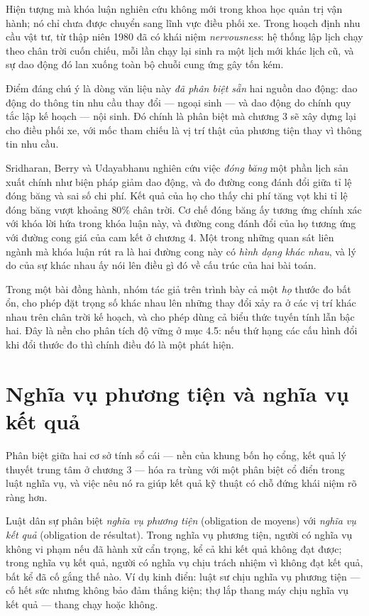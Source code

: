 Hiện tượng mà khóa luận nghiên cứu không mới trong khoa học quản trị vận hành; nó chỉ chưa
được chuyển sang lĩnh vực điều phối xe. Trong hoạch định nhu cầu vật tư, từ thập niên 1980 đã
có khái niệm \emph{nervousness}: hệ thống lập lịch chạy theo chân trời cuốn chiếu, mỗi lần chạy
lại sinh ra một lịch mới khác lịch cũ, và sự dao động đó lan xuống toàn bộ chuỗi cung ứng gây
tốn kém.

Điểm đáng chú ý là dòng văn liệu này \emph{đã phân biệt sẵn} hai nguồn dao động: dao động do
thông tin nhu cầu thay đổi --- ngoại sinh --- và dao động do chính quy tắc lập kế hoạch ---
nội sinh. Đó chính là phân biệt mà chương 3 sẽ xây dựng lại cho điều phối xe, với mốc tham
chiếu là vị trí thật của phương tiện thay vì thông tin nhu cầu.

Sridharan, Berry và Udayabhanu \cite{sridharan1987} nghiên cứu việc \emph{đóng băng} một phần
lịch sản xuất chính như biện pháp giảm dao động, và đo đường cong đánh đổi giữa tỉ lệ đóng băng
và sai số chi phí. Kết quả của họ cho thấy chi phí tăng vọt khi tỉ lệ đóng băng vượt khoảng
$80\%$ chân trời. Cơ chế đóng băng ấy tương ứng chính xác với khóa lời hứa trong khóa luận này,
và đường cong đánh đổi của họ tương ứng với đường cong giá của cam kết ở chương 4. Một trong
những quan sát liên ngành mà khóa luận rút ra là hai đường cong này có \emph{hình dạng khác
nhau}, và lý do của sự khác nhau ấy nói lên điều gì đó về cấu trúc của hai bài toán.

Trong một bài đồng hành, nhóm tác giả trên trình bày cả một \emph{họ} thước đo bất ổn, cho phép
đặt trọng số khác nhau lên những thay đổi xảy ra ở các vị trí khác nhau trên chân trời kế hoạch,
và cho phép dùng cả biểu thức tuyến tính lẫn bậc hai. Đây là nền cho phân tích độ vững ở mục
4.5: nếu thứ hạng các cấu hình đổi khi đổi thước đo thì chính điều đó là một phát hiện.

\section{Nghĩa vụ phương tiện và nghĩa vụ kết quả}

Phân biệt giữa hai cơ sở tính sổ cái --- nền của khung bốn họ cổng, kết quả lý thuyết trung tâm
ở chương 3 --- hóa ra trùng với một phân biệt cổ điển trong luật nghĩa vụ, và việc nêu nó ra giúp
kết quả kỹ thuật có chỗ đứng khái niệm rõ ràng hơn.

Luật dân sự phân biệt \emph{nghĩa vụ phương tiện} (obligation de moyens) với \emph{nghĩa vụ kết
quả} (obligation de résultat). Trong nghĩa vụ phương tiện, người có nghĩa vụ không vi phạm nếu
đã hành xử cẩn trọng, kể cả khi kết quả không đạt được; trong nghĩa vụ kết quả, người có nghĩa
vụ chịu trách nhiệm vì không đạt kết quả, bất kể đã cố gắng thế nào. Ví dụ kinh điển: luật sư
chịu nghĩa vụ phương tiện --- cố hết sức nhưng không bảo đảm thắng kiện; thợ lắp thang máy chịu
nghĩa vụ kết quả --- thang chạy hoặc không.

